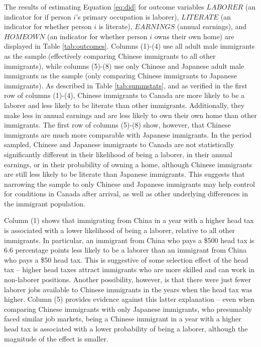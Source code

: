 \documentclass[12pt]{article}
\begin{document}
The results of estimating Equation \ref{eq:did} for outcome variables $LABORER$ (an indicator for if person $i$'s primary occupation is laborer), $LITERATE$ (an indicator for whether person $i$ is literate), $EARNINGS$ (annual earnings), and $HOMEOWN$ (an indicator for whether person $i$ owns their own home) are displayed in Table \ref{tab:outcomes}. Columns (1)-(4) use all adult male immigrants as the sample (effectively comparing Chinese immigrants to all other immigrants), while columns (5)-(8) use only Chinese and Japanese adult male immigrants as the sample (only comparing Chinese immigrants to Japanese immigrants). 
As described in Table \ref{tab:summstats}, and as verified in the first row of columns (1)-(4), Chinese immigrants to Canada are more likely to be a laborer and less likely to be literate than other immigrants. Additionally, they make less in annual earnings and are less likely to own their own home than other immigrants. The first row of columns (5)-(8) show, however, that Chinese immigrants are much more comparable with Japanese immigrants. In the period sampled, Chinese and Japanese immigrants to Canada are not statistically significantly different in their likelihood of being a laborer, in their annual earnings, or in their probability of owning a home, although Chinese immigrants are still less likely to be literate than Japanese immigrants. This suggests that narrowing the sample to only Chinese and Japanese immigrants may help control for conditions in Canada after arrival, as well as other underlying differences in the immigrant population.

Column (1) shows that immigrating from China in a year with a higher head tax is associated with a lower likelihood of being a laborer, relative to all other immigrants. In particular, an immigrant from China who pays a \$500 head tax is 6.6 percentage points less likely to be a laborer than an immigrant from China who pays a \$50 head tax. This is suggestive of some selection effect of the head tax -- higher head taxes attract immigrants who are more skilled and can work in non-laborer positions. Another possibility, however, is that there were just fewer laborer jobs available to Chinese immigrants in the years when the head tax was higher. 
Column (5) provides evidence against this latter explanation -- even when comparing Chinese immigrants with only Japanese immigrants, who presumably faced similar job markets, being a Chinese immigrant in a year with a higher head tax is associated with a lower probability of being a laborer, although the magnitude of the effect is smaller.
\end{document}
